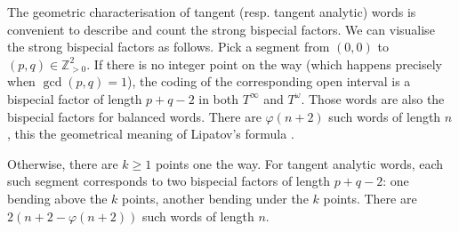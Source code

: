 \documentclass[preliminary]{eptcs}
\begin{document}
\newline
The geometric characterisation of tangent (resp. tangent analytic) words
is convenient to describe and count the strong bispecial factors.
We can visualise the strong bispecial factors as follows.
Pick a segment from  $(0,0)$ to $(p,q) \in \mathbb{Z}_{>0}^2$.
\newline
If there is no integer point on the way (which happens precisely when
$\gcd(p,q) = 1$), the coding of the corresponding open interval is a
bispecial factor of length $p+q-2$ in both $T^\infty$ and $T^\omega$.
Those words are also the bispecial factors for balanced words. There are
$\varphi(n+2)$ such words of length $n$, this the geometrical meaning of
Lipatov's formula \cite{Lipatov1982}.
\newline \newline



\begin{center}
\end{center}
Otherwise, there are $k\geq 1$ points one the way. 
For tangent analytic words, each such segment corresponds to two bispecial
factors of length $p+q-2$: one bending above the $k$ points, another bending under
the $k$ points. There are $2(n + 2 - \varphi(n+2))$ such words of length $n$.
\end{document}
